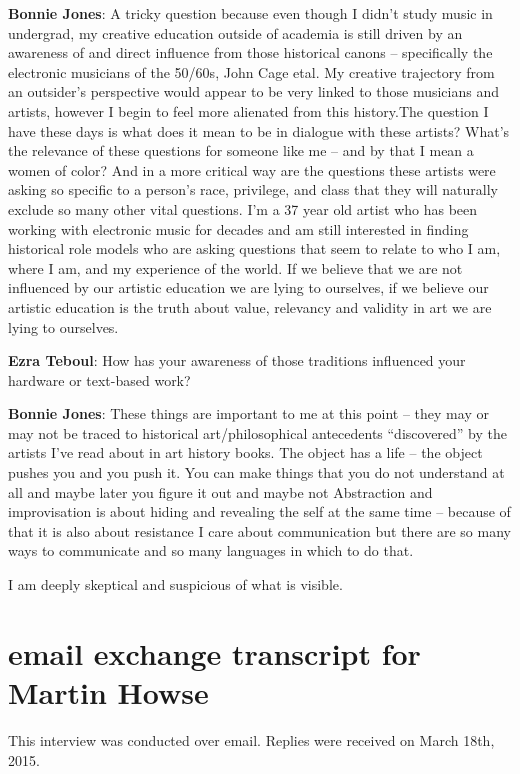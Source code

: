 \textbf{Bonnie Jones}: A tricky question because even though I didn’t study music in undergrad, my creative education outside of academia is still driven by an awareness of and direct influence from those historical canons – specifically the electronic musicians of the 50/60s, John Cage etal. My creative trajectory from an outsider’s perspective would appear to be very linked to those musicians and artists, however I begin to feel more alienated from this history.The question I have these days is what does it mean to be in dialogue with these artists? What’s the relevance of these questions for someone like me – and by that I mean a women of color? And in a more critical way are the questions these artists were asking so specific to a person’s race, privilege, and class that they will naturally exclude so many other vital questions. I’m a 37 year old artist who has been working with electronic music for decades and am still interested in finding historical role models who are asking questions that seem to relate to who I am, where I am, and my experience of the world. If we believe that we are not influenced by our artistic education we are lying to ourselves, if we believe our artistic education is the truth about value, relevancy and validity in art we are lying to ourselves. 

\textbf{Ezra Teboul}: How has your awareness of those traditions influenced your hardware or text-based work? 

\textbf{Bonnie Jones}: These things are important to me at this point – they may or may not be traced to historical art/philosophical antecedents ``discovered'' by the artists I’ve read about in art history books. The object has a life – the object pushes you and you push it. You can make things that you do not understand at all and maybe later you figure it out and maybe not Abstraction and improvisation is about hiding and revealing the self at the same time – because of that it is also about resistance 
I care about communication but there are so many ways to communicate and so many languages in which to do that.

I am deeply skeptical and suspicious of what is visible. 

\newpage

\clearpage 
\section{email exchange transcript for Martin Howse}

This interview was conducted over email. Replies were received on March 18th, 2015. 

